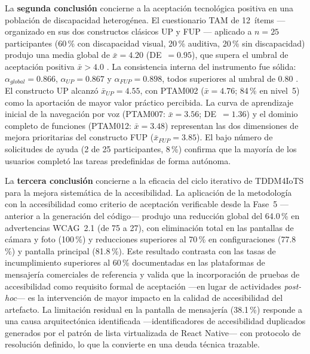 \documentclass[journal]{IEEEtran}
\begin{document}
	La \textbf{segunda conclusi\'on} concierne a la aceptaci\'on tecnol\'ogica positiva en una poblaci\'on de discapacidad heterog\'enea. El cuestionario TAM de 12~\'items ---organizado en sus dos constructos cl\'asicos UP y FUP \cite{davis1989}--- aplicado a $n=25$ participantes (60\,\% con discapacidad visual, 20\,\% auditiva, 20\,\% sin discapacidad) produjo una media global de $\bar{x}=4.20$ (DE~$=0.95$), que supera el umbral de aceptaci\'on positiva $\bar{x}>4.0$ \cite{julianto2023}. La consistencia interna del instrumento fue s\'olida: $\alpha_{global}=0.866$, $\alpha_{UP}=0.867$ y $\alpha_{FUP}=0.898$, todos superiores al umbral de 0.80 \cite{nunnally1978}. El constructo UP alcanz\'o $\bar{x}_{UP}=4.55$, con PTAM002 ($\bar{x}=4.76$; 84\,\% en nivel~5) como la aportaci\'on de mayor valor pr\'actico percibida. La curva de aprendizaje inicial de la navegaci\'on por voz (PTAM007: $\bar{x}=3.56$; DE~$=1.36$) y el dominio completo de funciones (PTAM012: $\bar{x}=3.48$) representan las dos dimensiones de mejora prioritarias del constructo FUP ($\bar{x}_{FUP}=3.85$). El bajo n\'umero de solicitudes de ayuda (2 de 25 participantes, 8\,\%) confirma que la mayor\'ia de los usuarios complet\'o las tareas predefinidas de forma aut\'onoma.
	
	La \textbf{tercera conclusi\'on} concierne a la eficacia del ciclo iterativo de TDDM4IoTS para la mejora sistem\'atica de la accesibilidad. La aplicaci\'on de la metodolog\'ia \cite{guerrero2020} con la accesibilidad como criterio de aceptaci\'on verificable desde la Fase~5 ---anterior a la generaci\'on del c\'odigo--- produjo una reducci\'on global del 64.0\,\% en advertencias WCAG~2.1 (de 75 a 27), con eliminaci\'on total en las pantallas de c\'amara y foto (100\,\%) y reducciones superiores al 70\,\% en configuraciones (77.8\,\%) y pantalla principal (81.8\,\%). Este resultado contrasta con las tasas de incumplimiento superiores al 60\,\% documentadas en las plataformas de mensajer\'ia comerciales de referencia \cite{chen2022} y valida que la incorporaci\'on de pruebas de accesibilidad como requisito formal de aceptaci\'on ---en lugar de actividades \textit{post-hoc}--- es la intervenci\'on de mayor impacto en la calidad de accesibilidad del artefacto. La limitaci\'on residual en la pantalla de mensajer\'ia (38.1\,\%) responde a una causa arquitect\'onica identificada ---identificadores de accesibilidad duplicados generados por el patr\'on de lista virtualizada de React Native--- con protocolo de resoluci\'on definido, lo que la convierte en una deuda t\'ecnica trazable.
	
\end{document}
